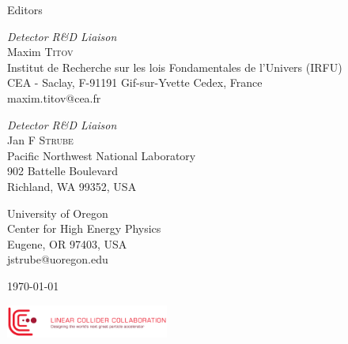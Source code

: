 \documentclass[10pt,final]{report}
\begin{document}
\begin{titlepage}
	\vfill\vfill
	{\large Editors\\}
	\begin{minipage}[t]{0.49\textwidth}
		\begin{flushleft}
			\large
			\textit{Detector R\&D Liaison}\\
			Maxim \textsc{Titov} \\
			Institut de Recherche sur les lois Fondamentales de l'Univers (IRFU) \\
			CEA - Saclay, F-91191 Gif-sur-Yvette Cedex, France\\
			maxim.titov@cea.fr
		\end{flushleft}
	\end{minipage}\hfill
	\begin{minipage}[t]{0.49\textwidth}
		\begin{flushright}
			\large
			\textit{Detector R\&D Liaison}\\
			Jan F \textsc{Strube} \\
			Pacific Northwest National Laboratory \\
			902 Battelle Boulevard \\
			Richland, WA 99352, USA \\
		\end{flushright}
			\begin{flushright}
				\large
			University of Oregon \\
			Center for High Energy Physics \\
			Eugene, OR 97403, USA \\
			jstrube@uoregon.edu
			\end{flushright}
	\end{minipage}
		
	\vfill\vfill\vfill %
	{\large\today} %
	
	
	\vfill\vfill
    \includegraphics[width=0.4\textwidth]{signature_red2-cmyk}\\[1cm] %
	
	\vfill %
	
\end{titlepage}
\end{document}
